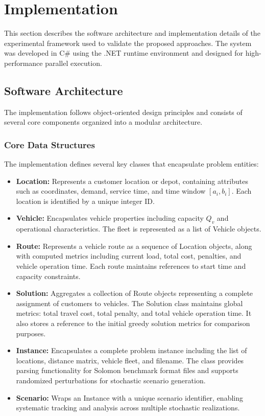 \section{Implementation}

This section describes the software architecture and implementation details of the experimental framework used to validate the proposed approaches. The system was developed in C\# using the .NET runtime environment and designed for high-performance parallel execution.

\subsection{Software Architecture}

The implementation follows object-oriented design principles and consists of several core components organized into a modular architecture.

\subsubsection{Core Data Structures}

The implementation defines several key classes that encapsulate problem entities:

\begin{itemize}
    \item \textbf{Location:} Represents a customer location or depot, containing attributes such as coordinates, demand, service time, and time window $[a_i, b_i]$. Each location is identified by a unique integer ID.
    
    \item \textbf{Vehicle:} Encapsulates vehicle properties including capacity $Q_v$ and operational characteristics. The fleet is represented as a list of Vehicle objects.
    
    \item \textbf{Route:} Represents a vehicle route as a sequence of Location objects, along with computed metrics including current load, total cost, penalties, and vehicle operation time. Each route maintains references to start time and capacity constraints.
    
    \item \textbf{Solution:} Aggregates a collection of Route objects representing a complete assignment of customers to vehicles. The Solution class maintains global metrics: total travel cost, total penalty, and total vehicle operation time. It also stores a reference to the initial greedy solution metrics for comparison purposes.
    
    \item \textbf{Instance:} Encapsulates a complete problem instance including the list of locations, distance matrix, vehicle fleet, and filename. The class provides parsing functionality for Solomon benchmark format files and supports randomized perturbations for stochastic scenario generation.
    
    \item \textbf{Scenario:} Wraps an Instance with a unique scenario identifier, enabling systematic tracking and analysis across multiple stochastic realizations.
\end{itemize}


